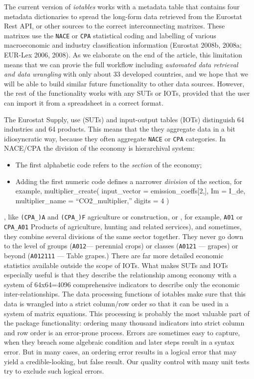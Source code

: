 \documentclass[
]{article}
\providecommand{\tightlist}{%
  \setlength{\itemsep}{0pt}\setlength{\parskip}{0pt}}
\begin{document}
The current version of \emph{iotables} works with a metadata table that
contains four metadata dictionaries to spread the long-form data
retrieved from the Eurostat Rest API, or other sources to the correct
interconnecting matrixes. These matrixes use the \texttt{NACE} or
\texttt{CPA} statistical coding and labelling of various macroeconomic
and industry classification information (Eurostat 2008b, 2008a; EUR-Lex
2006, 2008). As we elaborate on the end of the article, this limitation
means that we can provie the full workflow including \emph{automated
data retrieval and data wrangling} with only about 33 developed
countries, and we hope that we will be able to build similar future
functionality to other data sources. However, the rest of the
functionality works with any SUTs or IOTs, provided that the user can
import it from a spreadsheet in a correct format.

The Eurostat Supply, use (SUTs) and input-output tables (IOTs)
distinguish 64 industries and 64 products. This means that the they
aggregate data in a bit idiosyncratic way, because they often aggregate
\texttt{NACE} or \texttt{CPA} categories. In NACE/CPA the division of
the economy is hierarchival system:

\begin{itemize}
\tightlist
\item
  The first alphabetic code refers to the \emph{section} of the economy;
\item
  Adding the first numeric code defines a narrower \emph{division} of
  the section, for example, multiplier\_create( input\_vector =
  emission\_coeffs{[}2,{]}, Im = I\_de, multiplier\_name =
  ``CO2\_multiplier,'' digits = 4 )
\end{itemize}

, like \texttt{(CPA\_)A} and \texttt{(CPA\_)F} agriculture or
construction, or , for example, \texttt{A01} or \texttt{CPA\_A01}
Products of agriculture, hunting and related services), and sometimes,
they combine several divisions of the same sector together. They never
go down to the level of groups (\texttt{A012}--- perennial crops) or
classes (\texttt{A0121} --- grapes) or beyond (\texttt{A012111} ---
Table grapes.) There are far more detailed economic statistics available
outside the scope of IOTs. What makes SUTs and IOTs especially useful is
that they describe the relationship among economy with a system of
64x64=4096 comprehensive indicators to describe only the economic
inter-relationships. The data processing functions of iotables make sure
that this data is wrangled into a strict column/row order so that it can
be used in a system of matrix equations. This processing is probably the
most valuable part of the package functionality: ordering many thousand
indicators into strict column and row order is an error-prone process.
Errors are sometimes easy to capture, when they breach some algebraic
condition and later steps result in a syntax error. But in many cases,
an ordering error results in a logical error that may yield a
credible-looking, but false result. Our quality control with many unit
tests try to exclude such logical errors.
\end{document}

